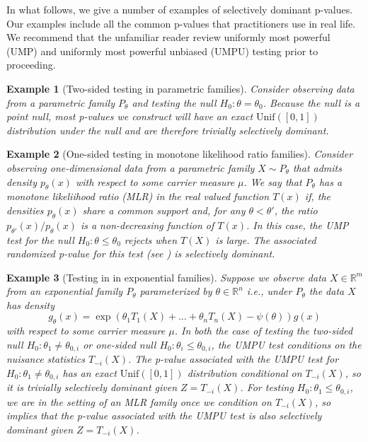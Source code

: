 \documentclass{article}
\newtheorem{example}{Example}
\newcommand{\R}{\mathbb{R}}
\begin{document}
In what follows, we give a number of examples of selectively dominant p-values. Our examples include all the common p-values that practitioners use in real life. We recommend that the unfamiliar reader review uniformly most powerful (UMP) and uniformly most powerful unbiased (UMPU) testing \cite[Chapter 3 and Chapter 4]{Lehmann} prior to proceeding.

\begin{example}[Two-sided testing in parametric families]
\label{exm:two-sided}
Consider observing data from a parametric family $P_{\theta}$ and testing the null $H_0 : \theta = \theta_0$. Because the null is a point null, most p-values we construct will have an exact $\text{Unif}([0, 1])$ distribution under the null and are therefore trivially selectively dominant. 
\end{example}

\begin{example}[One-sided testing in monotone likelihood ratio families]
\label{exm:mlr}
Consider observing one-dimensional data from a parametric family $X \sim P_{\theta}$ that admits density $p_{\theta}(x)$ with respect to some carrier measure $\mu$. We say that $P_{\theta}$ has a monotone likeliihood ratio (MLR) in the real valued function $T(x)$ if, the densities $p_{\theta}(x)$ share a common support and, for any $\theta < \theta'$, the ratio $p_{\theta'}(x)/p_{\theta}(x)$ is a non-decreasing function of $T(x)$. In this case, the UMP test for the null $H_0: \theta \leq \theta_0$ rejects when $T(X)$ is large. The associated randomized p-value for this test (see ) is selectively dominant. 
\end{example}

\begin{example}[Testing in in exponential families]
\label{exm:exp_fam}
Suppose we observe data $X \in \R^m$ from an exponential family $P_{\theta}$ parameterized by $\theta \in \R^n$ i.e., under $P_{\theta}$ the data $X$ has density  
\begin{equation*}
    g_{\theta}(x) = \exp( \theta_1 T_1(X) + \dots + \theta_n T_n(X) - \psi(\theta) ) g(x) 
\end{equation*}
with respect to some carrier measure $\mu$. In both the case of testing the two-sided null $H_0: \theta_1 \neq \theta_{0, i}$ or one-sided null $H_0: \theta_i \leq \theta_{0, i}$, the UMPU test conditions on the nuisance statistics $T_{-i}(X)$. The p-value associated with the UMPU test for $H_0: \theta_1 \neq \theta_{0, i}$ has an exact $\text{Unif}([0, 1])$ distribution conditional on $T_{-i}(X)$, so it is trivially selectively dominant given $Z = T_{-i}(X)$. For testing $H_0: \theta_1 \leq \theta_{0, i}$, we are in the setting of an MLR family once we condition on $T_{-i}(X)$, so  implies that the p-value associated with the UMPU test is also selectively dominant given $Z = T_{-i}(X)$.
\end{example}
\end{document}
